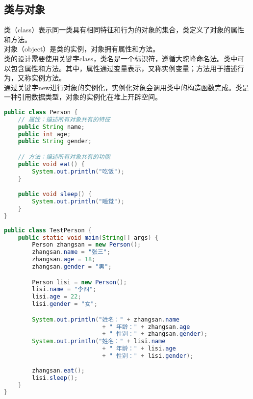 \subsection{类与对象}

类（class）表示同一类具有相同特征和行为的对象的集合，类定义了对象的属性和方法。\\

对象（object）是类的实例，对象拥有属性和方法。\\

类的设计需要使用关键字class，类名是一个标识符，遵循大驼峰命名法。类中可以包含属性和方法。其中，属性通过变量表示，又称实例变量；方法用于描述行为，又称实例方法。\\

通过关键字new进行对象的实例化，实例化对象会调用类中的构造函数完成。类是一种引用数据类型，对象的实例化在堆上开辟空间。\\


\begin{lstlisting}[language=Java, title=Person.java]
public class Person {
    // 属性：描述所有对象共有的特征
    public String name;
    public int age;
    public String gender;

    // 方法：描述所有对象共有的功能
    public void eat() {
        System.out.println("吃饭");
    }

    public void sleep() {
        System.out.println("睡觉");
    }
}
\end{lstlisting}

\begin{lstlisting}[language=Java, title=TestPerson.java]
public class TestPerson {
    public static void main(String[] args) {
        Person zhangsan = new Person();
        zhangsan.name = "张三";
        zhangsan.age = 18;
        zhangsan.gender = "男";

        Person lisi = new Person();
        lisi.name = "李四";
        lisi.age = 22;
        lisi.gender = "女";

        System.out.println("姓名：" + zhangsan.name 
                            + " 年龄：" + zhangsan.age
                            + " 性别：" + zhangsan.gender);
        System.out.println("姓名：" + lisi.name 
                            + " 年龄：" + lisi.age
                            + " 性别：" + lisi.gender);
        
        zhangsan.eat();
        lisi.sleep();
    }
}
\end{lstlisting}

